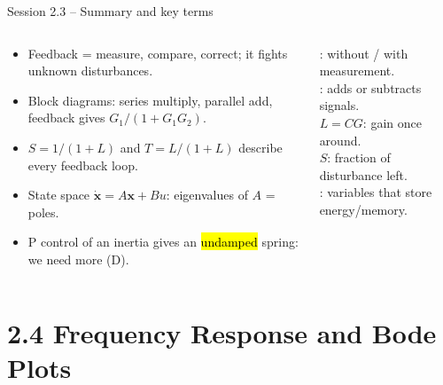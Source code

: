 \documentclass[aspectratio=169,10pt]{beamer}
\begin{document}
\begin{frame}{Session 2.3 -- Summary and key terms}
\begin{columns}[T]
\begin{keybox}
\footnotesize
\begin{itemize}
  \item Feedback = measure, compare, correct; it fights unknown disturbances.
  \item Block diagrams: series multiply, parallel add, feedback gives $G_1/(1+G_1G_2)$.
  \item $S=1/(1+L)$ and $T=L/(1+L)$ describe every feedback loop.
  \item State space $\dot{\bm x}=A\bm x+Bu$: eigenvalues of $A$ = poles.
  \item P control of an inertia gives an \hl{undamped} spring: we need more (D).
\end{itemize}
\end{keybox}
\begin{defbox}
\footnotesize
{}: without / with measurement.\\
: adds or subtracts signals.\\
 $L=CG$: gain once around.\\
 $S$: fraction of disturbance left.\\
: variables that store energy/memory.
\end{defbox}
\end{columns}
\end{frame}

\section{2.4 Frequency Response and Bode Plots}
\end{document}
